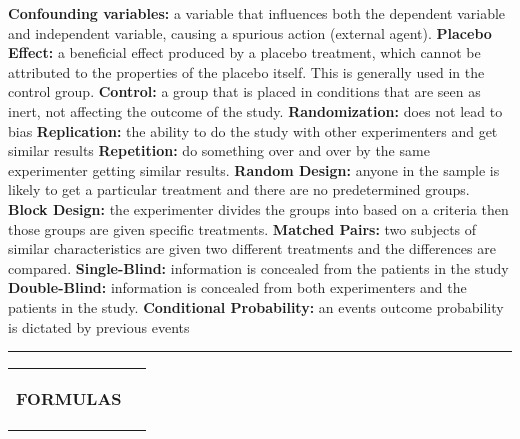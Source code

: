 \documentclass[6pt]{article}
\newcommand{\HL}{\par\noindent\rule{\textwidth}{0.4pt}}
\begin{document}
\begin{footnotesize}
\textbf{Confounding variables:} a variable that influences both the dependent variable and independent variable, causing a spurious action (external agent).
\textbf{Placebo Effect:} a beneficial effect produced by a placebo treatment, which cannot be attributed to the properties of the placebo itself. This is generally used in the control group.
\textbf{Control:} a group that is placed in conditions that are seen as inert, not affecting the outcome of the study.
\textbf{Randomization:} does not lead to bias
\textbf{Replication:} the ability to do the study with other experimenters and get similar results
\textbf{Repetition:} do something over and over by the same experimenter getting similar results.
\textbf{Random Design:} anyone in the sample is likely to get a particular treatment and there are no predetermined groups.
\textbf{Block Design:} the experimenter divides the groups into based on a criteria then those groups are given specific treatments.
\textbf{Matched Pairs:} two subjects of similar characteristics are given two different treatments and the differences are compared.
\textbf{Single-Blind:} information is concealed from the patients in the study
\textbf{Double-Blind:} information is  concealed from both experimenters and the patients in the study.
\textbf{Conditional Probability:} an events outcome probability is dictated by previous events

\HL

\begin{tabular}{l | l}

\parbox{0.5\textwidth}{

\begin{flushleft}
\textbf{FORMULAS}
\end{flushleft}

\begin{itemize}


\end{itemize}}
\end{tabular}
\end{footnotesize}
\end{document}
